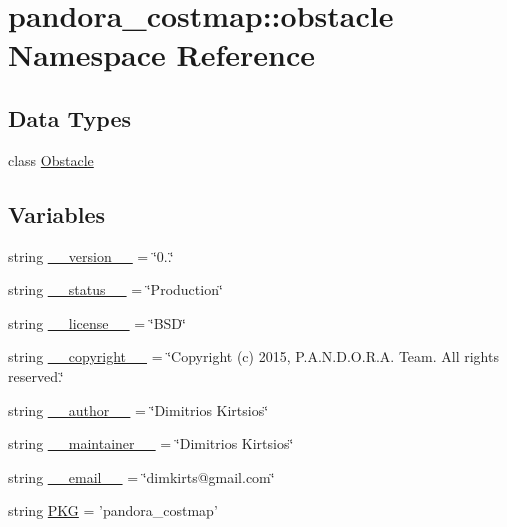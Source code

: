 \hypertarget{namespacepandora__costmap_1_1obstacle}{\section{pandora\-\_\-costmap\-:\-:obstacle \-Namespace \-Reference}
\label{namespacepandora__costmap_1_1obstacle}
}
\subsection*{\-Data \-Types}
\begin{DoxyCompactItemize}
\item 
class \hyperlink{classpandora__costmap_1_1obstacle_1_1_obstacle}{\-Obstacle}
\end{DoxyCompactItemize}
\subsection*{\-Variables}
\begin{DoxyCompactItemize}
\item 
string \hyperlink{namespacepandora__costmap_1_1obstacle_a0c95009178f960ef61f87f0bf5b98d8f}{\-\_\-\-\_\-version\-\_\-\-\_\-} = \char`\"{}0..\char`\"{}
\item 
string \hyperlink{namespacepandora__costmap_1_1obstacle_a5993ab8ae01428e6d694db695a06a32e}{\-\_\-\-\_\-status\-\_\-\-\_\-} = \char`\"{}\-Production\char`\"{}
\item 
string \hyperlink{namespacepandora__costmap_1_1obstacle_a321f81e4bb9e6723bcee5555cb202e44}{\-\_\-\-\_\-license\-\_\-\-\_\-} = \char`\"{}\-B\-S\-D\char`\"{}
\item 
string \hyperlink{namespacepandora__costmap_1_1obstacle_ada373277c4883191238e4bc9339d4d4d}{\-\_\-\-\_\-copyright\-\_\-\-\_\-} = \char`\"{}\-Copyright (c) 2015, \-P.\-A.\-N.\-D.\-O.\-R.\-A. \-Team. \-All rights reserved.\char`\"{}
\item 
string \hyperlink{namespacepandora__costmap_1_1obstacle_a908a01b680a6a10b14c450b79a23eded}{\-\_\-\-\_\-author\-\_\-\-\_\-} = \char`\"{}\-Dimitrios \-Kirtsios\char`\"{}
\item 
string \hyperlink{namespacepandora__costmap_1_1obstacle_a7320839ac9242add2a380b4408f8db59}{\-\_\-\-\_\-maintainer\-\_\-\-\_\-} = \char`\"{}\-Dimitrios \-Kirtsios\char`\"{}
\item 
string \hyperlink{namespacepandora__costmap_1_1obstacle_a57ac392439b8ce36b8dc6457ed5fb5aa}{\-\_\-\-\_\-email\-\_\-\-\_\-} = \char`\"{}dimkirts@gmail.\-com\char`\"{}
\item 
string \hyperlink{namespacepandora__costmap_1_1obstacle_ab054391cca3ddb8e1f42a69e4e8b9783}{\-P\-K\-G} = 'pandora\-\_\-costmap'
\end{DoxyCompactItemize}


